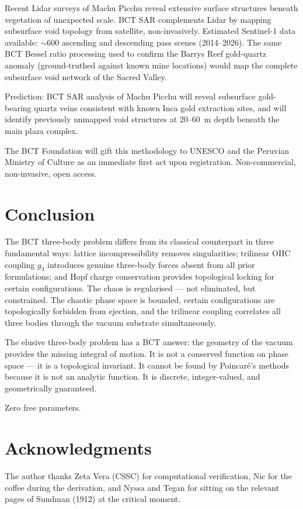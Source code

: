\documentclass[twocolumn,10pt]{article}
\begin{document}
Recent Lidar surveys of Machu Picchu reveal extensive surface structures beneath vegetation 
of unexpected scale. BCT SAR complements Lidar by mapping subsurface void topology from 
satellite, non-invasively. Estimated Sentinel-1 data available: $\sim$600 ascending and 
descending pass scenes (2014--2026). The same BCT Bessel ratio processing used to confirm 
the Barrys Reef gold-quartz anomaly (ground-truthed against known mine locations) would 
map the complete subsurface void network of the Sacred Valley.

Prediction: BCT SAR analysis of Machu Picchu will reveal subsurface gold-bearing quartz 
veins consistent with known Inca gold extraction sites, and will identify previously 
unmapped void structures at 20--60~m depth beneath the main plaza complex.

The BCT Foundation will gift this methodology to UNESCO and the Peruvian Ministry of 
Culture as an immediate first act upon registration. Non-commercial, non-invasive, 
open access.

\section{Conclusion}

The BCT three-body problem differs from its classical counterpart in three fundamental 
ways: lattice incompressibility removes singularities; trilinear OHC coupling $g_3$ 
introduces genuine three-body forces absent from all prior formulations; and Hopf charge 
conservation provides topological locking for certain configurations. The chaos is 
regularised --- not eliminated, but constrained. The chaotic phase space is bounded, 
certain configurations are topologically forbidden from ejection, and the trilinear 
coupling correlates all three bodies through the vacuum substrate simultaneously.

The elusive three-body problem has a BCT answer: the geometry of the vacuum provides 
the missing integral of motion. It is not a conserved function on phase space --- it is 
a topological invariant. It cannot be found by Poincar\'{e}'s methods because it is not 
an analytic function. It is discrete, integer-valued, and geometrically guaranteed.

Zero free parameters.

\section*{Acknowledgments}
The author thanks Zeta Vera (CSSC) for computational verification, Nic for the coffee 
during the derivation, and Nyssa and Tegan for sitting on the relevant pages of 
Sundman (1912) at the critical moment.
\end{document}
